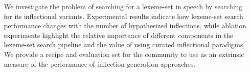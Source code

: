We investigate the problem of searching for a lexeme-set in speech by searching for its inflectional variants. Experimental results indicate how lexeme-set search performance changes with the number of hypothesized inflections, while ablation experiments highlight the relative importance of different components in the lexeme-set search pipeline and the value of using curated inflectional paradigms. We provide a recipe and evaluation set for the community to use as an extrinsic measure of the performance of inflection generation approaches.

